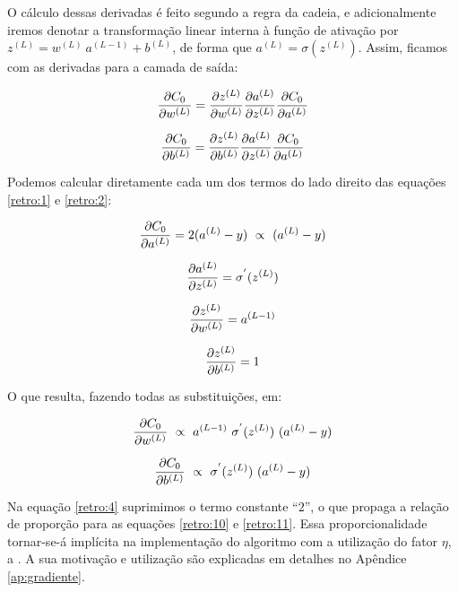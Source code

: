 O cálculo dessas derivadas é feito segundo a regra da cadeia, e adicionalmente iremos denotar a transformação linear interna à função de ativação por $z^{(L)} = w^{(L)}~a^{(L-1)} + b^{(L)}$, de forma que $a^{(L)} = \sigma(z^{(L)})$. Assim, ficamos com as derivadas para a camada de saída:

\begin{equation}\label{retro:1}
\frac{\partial C_0}{\partial w^{(L)}} = \frac{\partial z^{(L)}}{\partial w^{(L)}} \frac{\partial a^{(L)}}{\partial z^{(L)}} \frac{\partial C_0}{\partial a^{(L)}}
\end{equation}

\begin{equation}\label{retro:2}
\frac{\partial C_0}{\partial b^{(L)}} = \frac{\partial z^{(L)}}{\partial b^{(L)}} \frac{\partial a^{(L)}}{\partial z^{(L)}} \frac{\partial C_0}{\partial a^{(L)}}
\end{equation}

Podemos calcular diretamente cada um dos termos do lado direito das equações \eqref{retro:1} e \eqref{retro:2}:

\begin{equation}\label{retro:4}
\frac{\partial C_0}{\partial a^{(L)}} = 2(a^{(L)} - y) ~\propto~ (a^{(L)} - y)
\end{equation}

\begin{equation}\label{retro:5}
\frac{\partial a^{(L)}}{\partial z^{(L)}} = \sigma^{'}(z^{(L)})
\end{equation}

\begin{equation}\label{retro:6}
\frac{\partial z^{(L)}}{\partial w^{(L)}} = a^{(L-1)}
\end{equation}

\begin{equation}\label{retro:7}
\frac{\partial z^{(L)}}{\partial b^{(L)}} = 1
\end{equation}

O que resulta, fazendo todas as substituições, em:

\begin{equation}\label{retro:10}
\frac{\partial C_0}{\partial w^{(L)}} ~\propto~ a^{(L-1)}~ \sigma^{'}(z^{(L)})~ (a^{(L)} - y)
\end{equation}

\begin{equation}\label{retro:11}
\frac{\partial C_0}{\partial b^{(L)}} ~\propto~ \sigma^{'}(z^{(L)})~ (a^{(L)} - y)
\end{equation}

Na equação \eqref{retro:4} suprimimos o termo constante ``$2$'', o que propaga a relação de proporção para as equações \eqref{retro:10} e \eqref{retro:11}. Essa proporcionalidade tornar-se-á implícita na implementação do algoritmo com a utilização do fator $\eta$, a . A sua motivação e utilização são explicadas em detalhes no Apêndice \ref{ap:gradiente}. 

